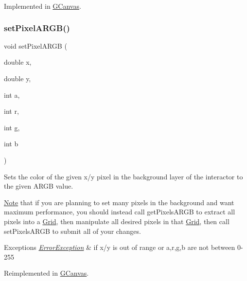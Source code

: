 Implemented in \mbox{\hyperlink{classGCanvas_a366f5f71f21ad732fd2e2fdf624f0953}{G\+Canvas}}.

\mbox{\label{classGDrawingSurface_a62a8b1555ae3a073a84b0a1c071c65b1}} 
\subsubsection{\texorpdfstring{set\+Pixel\+A\+R\+G\+B()}{setPixelARGB()}\hspace{0.1cm}{\footnotesize\ttfamily [2/2]}}
{\footnotesize\ttfamily void set\+Pixel\+A\+R\+GB (\begin{DoxyParamCaption}\item[{double}]{x,  }\item[{double}]{y,  }\item[{int}]{a,  }\item[{int}]{r,  }\item[{int}]{g,  }\item[{int}]{b }\end{DoxyParamCaption})\hspace{0.3cm}{\ttfamily [virtual]}}



Sets the color of the given x/y pixel in the background layer of the interactor to the given A\+R\+GB value. 

\mbox{\hyperlink{classNote}{Note}} that if you are planning to set many pixels in the background and want maximum performance, you should instead call get\+Pixels\+A\+R\+GB to extract all pixels into a \mbox{\hyperlink{classGrid}{Grid}}, then manipulate all desired pixels in that \mbox{\hyperlink{classGrid}{Grid}}, then call set\+Pixels\+A\+R\+GB to submit all of your changes.


\begin{DoxyExceptions}{Exceptions}
{\em \mbox{\hyperlink{classErrorException}{Error\+Exception}}} & if x/y is out of range or a,r,g,b are not between 0-\/255 \\
\hline
\end{DoxyExceptions}


Reimplemented in \mbox{\hyperlink{classGCanvas_a3de28156839da845f8d24503c9a3b111}{G\+Canvas}}.

\mbox{\label{classGDrawingSurface_aa80f4b7381bd418116baee600eed37fe}} 

